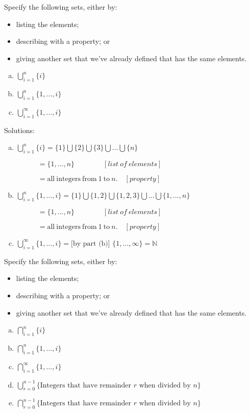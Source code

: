 \begin{example}
Specify the following sets, either by:
\begin{itemize}
\item
listing the elements;
\item
describing with a property; or
\item
giving another set that we've already defined that has the same elements.
\end{itemize}
\begin{enumerate}[(a)]
\item
$\bigcup_{i = 1}^{n}  \{i\}$
\item
$\bigcup_{i = 1}^{n}  \{1, \ldots, i\}$
\item
$\bigcup_{i = 1}^{\infty}  \{1, \ldots, i\}$
\end{enumerate}
\noindent
Solutions:
\begin{enumerate}[(a)]
\item
$\bigcup_{i = 1}^{n}  \{i\} = \{1\} \bigcup \{2\} \bigcup \{ 3 \} \bigcup \ldots \bigcup \{n\} $

$\qquad \quad = \{1, \ldots , n\} \qquad \qquad [list~of~elements] $

$ \qquad \quad = \mathrm{all~integers~from~1~to~}n. \quad [property]$
\item
$\bigcup_{i = 1}^{n}  \{1, \ldots, i\} = \{1\} \bigcup \{1, 2\} \bigcup \{1, 2, 3 \} \bigcup \ldots \bigcup \{1, \ldots , n\} $

$\qquad \quad = \{1, \ldots , n\} \qquad \qquad [list~of~elements]$

$\qquad \quad = \mathrm{all~integers~from~1~to~}n. \quad [property]$
\item
$\bigcup_{i = 1}^{\infty}  \{1, \ldots, i\} = \textrm{[by part (b)]   } \{1, \ldots , \infty\} = {\mathbb N}$
\end{enumerate}
\end{example} 

\begin{exercise}\label{exercise:sets:14}
Specify the following sets, either by:
\begin{itemize}
\item
listing the elements;
\item
describing with a property; or
\item
giving another set that we've already defined that has the same elements.
\end{itemize}
\begin{enumerate}[(a)]
\item
$\bigcap_{i = 1}^{n}  \{i\}$
\item
$\bigcap_{i = 1}^{n}  \{1, \ldots, i\}$
\item
$\bigcap_{i = 1}^{\infty}  \{1, \ldots, i\}$
\item
$\bigcup_{r = 0}^{n-1}  \{\mbox{Integers that have remainder }r \mbox{ when divided by }n\}$
\item
$\bigcap_{r = 0}^{n-1}  \{\mbox{Integers that have remainder }r \mbox{ when divided by }n\}$
\end{enumerate}
\end{exercise}


